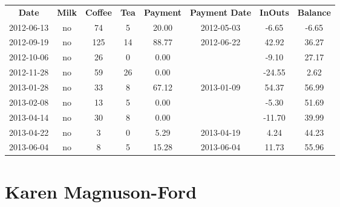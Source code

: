 \begin{center}
\begin{tabular}{cccccccc}
\textbf{Date} & \textbf{Milk} & \textbf{Coffee} & \textbf{Tea} & \textbf{Payment} & \textbf{Payment Date} & \textbf{InOuts} & \textbf{Balance} \\
2012-06-13 & no &  74 &  5 & 20.00 & 2012-05-03 &  -6.65 & -6.65\\ 
2012-09-19 & no & 125 & 14 & 88.77 & 2012-06-22 &  42.92 & 36.27\\ 
2012-10-06 & no &  26 &  0 &  0.00 &  &  -9.10 & 27.17\\ 
2012-11-28 & no &  59 & 26 &  0.00 &  & -24.55 &  2.62\\ 
2013-01-28 & no &  33 &  8 & 67.12 & 2013-01-09 &  54.37 & 56.99\\ 
2013-02-08 & no &  13 &  5 &  0.00 &  &  -5.30 & 51.69\\ 
2013-04-14 & no &  30 &  8 &  0.00 &  & -11.70 & 39.99\\ 
2013-04-22 & no &   3 &  0 &  5.29 & 2013-04-19 &   4.24 & 44.23\\ 
2013-06-04 & no &   8 &  5 & 15.28 & 2013-06-04 &  11.73 & 55.96
\end{tabular}
\end{center}

\section{Karen Magnuson-Ford}

